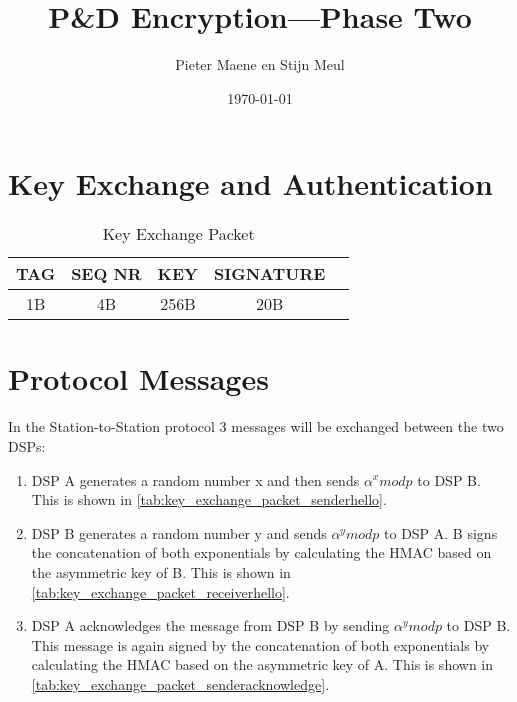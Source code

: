 \documentclass[a4paper]{article}
\title{P\&D Encryption---Phase Two}
\author{Pieter Maene en Stijn Meul}
\date{\today}
\begin{document}
\maketitle

\section{Key Exchange and Authentication}

\begin{table}[H]
    \begin{center}
        \begin{tabular}{| c | c | c | c | c |}
            \hline
            TAG & SEQ NR & KEY & SIGNATURE \\ \hline
            1B & 4B & 256B & 20B \\
            \hline
        \end{tabular}
    \end{center}
    
    \caption{Key Exchange Packet}
    \label{tab:key_exchange_packet}
\end{table}

\section{Protocol Messages}
In the Station-to-Station protocol 3 messages will be exchanged between the two DSPs:

\begin{enumerate}
 \item DSP A generates a random number x and then sends $\alpha^x mod p$ to DSP B. This is shown in \ref{tab:key_exchange_packet_senderhello}.
 \item DSP B generates a random number y and sends $\alpha^y mod p$ to DSP A. B signs the concatenation of both exponentials by calculating the HMAC based on the asymmetric key of B. This is shown in \ref{tab:key_exchange_packet_receiverhello}.
 \item DSP A acknowledges the message from DSP B by sending $\alpha^y mod p$ to DSP B. This message is again signed by the concatenation of both exponentials by calculating the HMAC based on the asymmetric key of A. This is shown in \ref{tab:key_exchange_packet_senderacknowledge}.
\end{enumerate}
\end{document}
